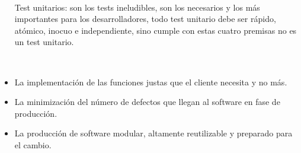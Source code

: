 \begin{flushleft}
\begin{itemize}
\textbf{}\\
Test unitarios: son los tests ineludibles, son los necesarios y los más importantes para los desarrolladores, todo test unitario debe ser rápido, atómico, inocuo e independiente, sino cumple con estas cuatro premisas no es un test unitario.

\textbf{}\\
\item  La implementación de las funciones justas que el cliente necesita y no más.

\item  La minimización del número de defectos que llegan al software en fase de producción.

\item La producción de software modular, altamente reutilizable y preparado para el cambio.
\end{itemize} 







\end{flushleft}




